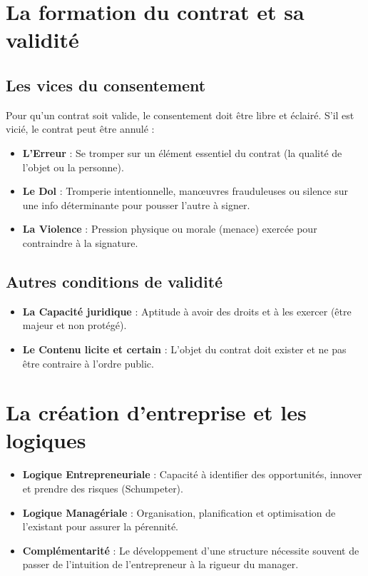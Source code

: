 \documentclass[11pt,a4paper]{article}
\begin{document}
\section{La formation du contrat et sa validité}
\subsection{Les vices du consentement}
Pour qu'un contrat soit valide, le consentement doit être libre et éclairé. S'il est vicié, le contrat peut être annulé :
\begin{itemize}[label=--]
    \item \textbf{L'Erreur} : Se tromper sur un élément essentiel du contrat (la qualité de l'objet ou la personne).
    \item \textbf{Le Dol} : Tromperie intentionnelle, manœuvres frauduleuses ou silence sur une info déterminante pour pousser l'autre à signer.
    \item \textbf{La Violence} : Pression physique ou morale (menace) exercée pour contraindre à la signature.
\end{itemize}

\subsection{Autres conditions de validité}
\begin{itemize}[label=--]
    \item \textbf{La Capacité juridique} : Aptitude à avoir des droits et à les exercer (être majeur et non protégé).
    \item \textbf{Le Contenu licite et certain} : L'objet du contrat doit exister et ne pas être contraire à l'ordre public.
\end{itemize}

\section{La création d'entreprise et les logiques}
\begin{itemize}[label=$\bullet$]
    \item \textbf{Logique Entrepreneuriale} : Capacité à identifier des opportunités, innover et prendre des risques (Schumpeter).
    \item \textbf{Logique Managériale} : Organisation, planification et optimisation de l'existant pour assurer la pérennité.
    \item \textbf{Complémentarité} : Le développement d'une structure nécessite souvent de passer de l'intuition de l'entrepreneur à la rigueur du manager.
\end{itemize}
\end{document}
